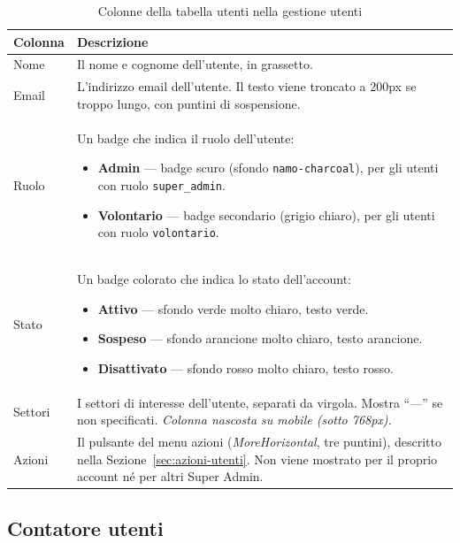 \documentclass[a4paper,11pt,oneside]{book}
\begin{document}
\begin{table}[htbp]
\centering
\caption{Colonne della tabella utenti nella gestione utenti}
\label{tab:colonne-utenti}
\begin{tabularx}{\textwidth}{l X}
\toprule
\textbf{Colonna} & \textbf{Descrizione} \\
\midrule
Nome    & Il nome e cognome dell'utente, in grassetto. \\
Email   & L'indirizzo email dell'utente. Il testo viene troncato a 200px se troppo lungo, con puntini di sospensione. \\
Ruolo   & Un badge che indica il ruolo dell'utente:
          \begin{itemize}[leftmargin=1em, topsep=0pt]
            \item \textbf{Admin} --- badge scuro (sfondo \texttt{namo-charcoal}), per gli utenti con ruolo \texttt{super\_admin}.
            \item \textbf{Volontario} --- badge secondario (grigio chiaro), per gli utenti con ruolo \texttt{volontario}.
          \end{itemize} \\
Stato   & Un badge colorato che indica lo stato dell'account:
          \begin{itemize}[leftmargin=1em, topsep=0pt]
            \item \textcolor{namoGreen}{\textbf{Attivo}} --- sfondo verde molto chiaro, testo verde.
            \item \textcolor{namoOrange}{\textbf{Sospeso}} --- sfondo arancione molto chiaro, testo arancione.
            \item \textcolor{namoRed}{\textbf{Disattivato}} --- sfondo rosso molto chiaro, testo rosso.
          \end{itemize} \\
Settori & I settori di interesse dell'utente, separati da virgola. Mostra ``---'' se non specificati. \textit{Colonna nascosta su mobile (sotto 768px).} \\
Azioni  & Il pulsante del menu azioni (\textit{MoreHorizontal}, tre puntini), descritto nella Sezione~\ref{sec:azioni-utenti}. Non viene mostrato per il proprio account n\'e per altri Super Admin. \\
\bottomrule
\end{tabularx}
\end{table}

\subsection{Contatore utenti}
\end{document}
